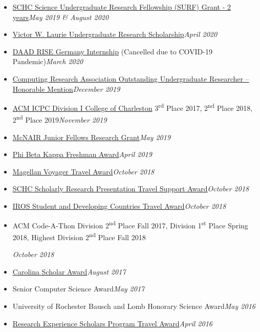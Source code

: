 \documentclass[\ifdefined\cv10pt\else10pt\fi,letterpaper]{moderncv}
\newcommand{\cvonly}[1]{\ifdefined\cv#1\fi\ignorespaces}
\renewcommand{\cvitem}[2]{\item {#1}\hfill\textit{#2}}
\newcommand{\st}{\textsuperscript{st}\xspace}
\newcommand{\nd}{\textsuperscript{nd}\xspace}
\newcommand{\rd}{\textsuperscript{rd}\xspace}
\begin{document}
\begin{itemize}
	\cvitem{\href{https://www.sc.edu/study/colleges_schools/honors_college/internal/beyond_the_classroom/undergraduate_research/surf_and_exploration_grants/index.php}{SCHC Science Undergraduate Research Fellowship (SURF) Grant - 2 years}}{May 2019 \& August 2020}
	\cvitem{\href{https://sc.edu/study/colleges_schools/artsandsciences/mathematics/study/awards_scholarships/}{Victor W. Laurie Undergraduate Research Scholarship}}{April 2020}
	\cvitem{\href{https://www.daad.de/rise/en/rise-germany/}{DAAD RISE Germany Internship} (Cancelled due to COVID-19 Pandemic)}{March 2020}
	\cvitem{\href{https://cra.org/about/awards/outstanding-undergraduate-researcher-award/}{Computing Research Association Outstanding Undergraduate Researcher -- Honorable Mention}}{December 2019}  %
	\cvonly{\cvitem{\href{http://compsci.cofc.edu/ACM-ICPC.php}{ACM ICPC Division I College of Charleston} 3\rd Place 2017, 2\nd Place 2018, 2\nd Place 2019}{November 2019}}
	\cvitem{\href{https://sc.edu/about/offices_and_divisions/undergraduate_research/apply_for_funding/other_money_opportunities/cec_mcnair-research-fellows-summer/index.php}{McNAIR Junior Fellows Research Grant}}{May 2019}  %
	\cvitem{\href{https://www.sc.edu/uofsc/announcements/posts/2019/04/university_awards_day_2019.php}{Phi Beta Kappa Freshman Award}}{April 2019}
	\cvitem{\href{https://www.sc.edu/about/offices_and_divisions/undergraduate_research/apply_for_funding/our_funding/conference-travel/index.php}{Magellan Voyager Travel Award}}{October 2018}
	\cvitem{\href{https://www.sc.edu/study/colleges_schools/honors_college/experience/undergraduate_research/index.php}{SCHC Scholarly Research Presentation Travel Support Award}}{October 2018}
	\cvitem{\href{https://www.iros2018.org/travel-grants}{IROS Student and Developing Countries Travel Award}}{October 2018}
	\cvonly{\cvitem{\parbox[t]{0.75\linewidth}{ACM Code-A-Thon Division 2\nd Place Fall 2017, Division 1\st Place Spring 2018, Highest Division 2\nd Place Fall 2018}\vspace*{0.6ex}}{October 2018}}
	\cvitem{\href{https://sc.edu/about/offices_and_divisions/undergraduate_admissions/honors_and_scholars_programs/top_scholars/}{Carolina Scholar Award}}{August 2017}
	\cvonly{\cvitem{Senior Computer Science Award}{May 2017}}
	\cvonly{\cvitem{University of Rochester Bausch and Lomb Honorary Science Award}{May 2016}}
	\cvonly{\cvitem{\href{https://www.scgssm.org/residential/academics/senior-research}{Research Experience Scholars Program Travel Award}}{April 2016}}
\end{itemize}
\end{document}
